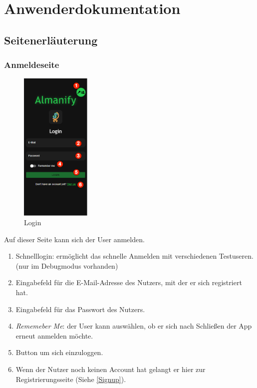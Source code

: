 \section{Anwenderdokumentation}



\subsection{Seitenerläuterung}

\subsubsection{Anmeldeseite}\label{Login}
\begin{figure}[H]
	\centering
	\includegraphics[width=0.3\textwidth]{img/pages_numbers/login.drawio}
	\caption[Login]{Login}
	\label{fig:Login}
\end{figure}

Auf dieser Seite kann sich der User anmelden.

\begin{enumerate}[label=\protect\circled{\arabic*}]
	\item Schnelllogin: ermöglicht das schnelle Anmelden mit verschiedenen Testuseren. (nur im Debugmodus vorhanden)
	\item Eingabefeld für die E-Mail-Adresse des Nutzers, mit der er sich registriert hat.
	\item Eingabefeld für das Passwort des Nutzers.
	\item \emph{Rememeber Me}: der User kann auswählen, ob er sich nach Schließen der App erneut anmelden möchte.
	\item Button um sich einzuloggen.
	\item Wenn der Nutzer noch keinen Account hat gelangt er hier zur Registrierungsseite (Siehe \ref{Signup}).
\end{enumerate}

